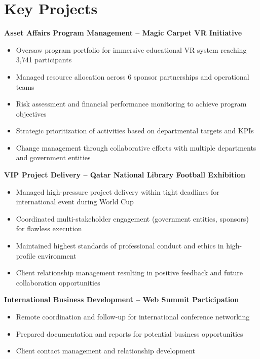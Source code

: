 \documentclass[a4paper,12pt]{article}
\begin{document}
\vspace{5pt}

\section{Key Projects}

\textbf{Asset Affairs Program Management -- Magic Carpet VR Initiative}
\begin{itemize}[nosep,after=\strut, leftmargin=1em, itemsep=2pt,label=--]
\item Oversaw program portfolio for immersive educational VR system reaching 3,741 participants
\item Managed resource allocation across 6 sponsor partnerships and operational teams
\item Risk assessment and financial performance monitoring to achieve program objectives
\item Strategic prioritization of activities based on departmental targets and KPIs
\item Change management through collaborative efforts with multiple departments and government entities
\end{itemize}

\textbf{VIP Project Delivery -- Qatar National Library Football Exhibition}
\begin{itemize}[nosep,after=\strut, leftmargin=1em, itemsep=2pt,label=--]
\item Managed high-pressure project delivery within tight deadlines for international event during World Cup
\item Coordinated multi-stakeholder engagement (government entities, sponsors) for flawless execution
\item Maintained highest standards of professional conduct and ethics in high-profile environment
\item Client relationship management resulting in positive feedback and future collaboration opportunities
\end{itemize}

\textbf{International Business Development -- Web Summit Participation}
\begin{itemize}[nosep,after=\strut, leftmargin=1em, itemsep=2pt,label=--]
\item Remote coordination and follow-up for international conference networking
\item Prepared documentation and reports for potential business opportunities
\item Client contact management and relationship development
\end{itemize}
\end{document}
